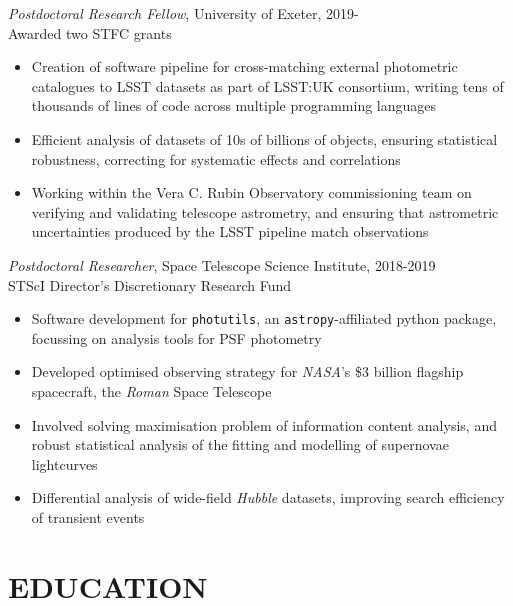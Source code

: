 \documentclass[letter, margin, 10pt]{res} %
\begin{document}
\begin{resume}
{\sl Postdoctoral Research Fellow}, University of Exeter, 2019-\\
\null\quad\quad Awarded two STFC grants
\begin{itemize}[noitemsep,topsep=0pt,parsep=0pt,partopsep=0pt]
\item Creation of software pipeline for cross-matching external photometric catalogues to LSST datasets as part of LSST:UK consortium, writing tens of thousands of lines of code across multiple programming languages
\item Efficient analysis of datasets of 10s of billions of objects, ensuring statistical robustness, correcting for systematic effects and correlations
\item Working within the Vera C. Rubin Observatory commissioning team on verifying and validating telescope astrometry, and ensuring that astrometric uncertainties produced by the LSST pipeline match observations
\end{itemize}
\vspace{-10pt}
{\sl Postdoctoral Researcher}, Space Telescope Science Institute, 2018-2019\\
\null\quad\quad STScI Director's Discretionary Research Fund
\begin{itemize}[noitemsep,topsep=0pt,parsep=0pt,partopsep=0pt]
\item Software development for \texttt{photutils}, an \texttt{astropy}-affiliated python package, focussing on analysis tools for PSF photometry
\item Developed optimised observing strategy for \textit{NASA}'s \$3 billion flagship spacecraft, the \textit{Roman} Space Telescope
\item Involved solving maximisation problem of information content analysis, and robust statistical analysis of the fitting and modelling of supernovae lightcurves
\item Differential analysis of wide-field \textit{Hubble} datasets, improving search efficiency of transient events
\end{itemize}
\vspace{-6pt}
\section{EDUCATION}


\end{resume}
\end{document}
